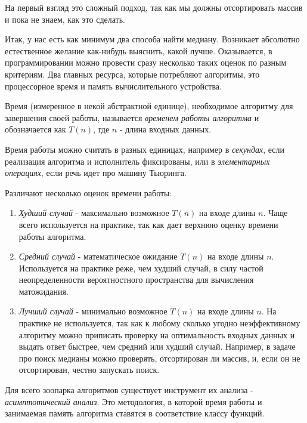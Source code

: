 \documentclass[../book.tex]{subfiles}
\begin{document}
	На первый взгляд это сложный подход, так как мы должны отсортировать массив и пока не знаем, как это сделать.
		
	Итак, у нас есть как минимум два способа найти медиану. Возникает абсолютно естественное желание как-нибудь выяснить, какой лучше. Оказывается, в программировании можно провести сразу несколько таких оценок по разным критериям. Два главных ресурса, которые потребляют алгоритмы, это процессорное время и память вычислительного устройства.
	
	\begin{definition}
		Время (измеренное в некой абстрактной единице), необходимое алгоритму для завершения своей работы, называется \textit{временем работы алгоритма} и обозначается как $T(n)$, где $n$ - длина входных данных.
	\end{definition}
	
	Время работы можно считать в разных единицах, например в \textit{секундах}, если реализация алгоритма и исполнитель фиксированы, или в \textit{элементарных операциях}, если речь идет про машину Тьюринга.
	
	Различают несколько оценок времени работы:
	\begin{enumerate}
		\item \textit{Худший случай} - максимально возможное $T(n)$ на входе длины $n$. Чаще всего используется на практике, так как дает верхнюю оценку времени работы алгоритма.
		\item \textit{Средний случай} - математическое ожидание $T(n)$ на входе длины $n$. Используется на практике реже, чем худший случай, в силу частой неопределенности вероятностного пространства для вычисления матожидания.
		\item \textit{Лучший случай} - минимально возможное $T(n)$ на входе длины $n$. На практике не используется, так как к любому сколько угодно неэффективному алгоритму можно приписать проверку на оптимальность входных данных и выдать ответ быстрее, чем средний или худший случай. Например, в задаче про поиск медианы можно проверять, отсортирован ли массив, и, если он не отсортирован, честно запускать поиск.
	\end{enumerate}
	
	Для всего зоопарка алгоритмов существует инструмент их анализа - \textit{асимптотический анализ}. Это методология, в которой время работы и занимаемая память алгоритма ставятся в соответствие классу функций.
	
\end{document}
